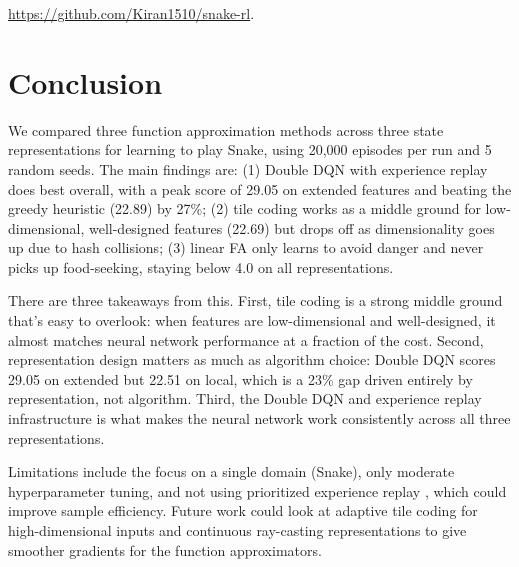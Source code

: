 \documentclass[letterpaper]{article}
\begin{document}
\url{https://github.com/Kiran1510/snake-rl}.

\section{Conclusion}

We compared three function approximation methods across three state representations for learning to play Snake, using 20,000 episodes per run and 5 random seeds. The main findings are: (1) Double DQN with experience replay does best overall, with a peak score of 29.05 on extended features and beating the greedy heuristic (22.89) by 27\%; (2) tile coding works as a middle ground for low-dimensional, well-designed features (22.69) but drops off as dimensionality goes up due to hash collisions; (3) linear FA only learns to avoid danger and never picks up food-seeking, staying below 4.0 on all representations.

There are three takeaways from this. First, tile coding is a strong middle ground that's easy to overlook: when features are low-dimensional and well-designed, it almost matches neural network performance at a fraction of the cost. Second, representation design matters as much as algorithm choice: Double DQN scores 29.05 on extended but 22.51 on local, which is a 23\% gap driven entirely by representation, not algorithm. Third, the Double DQN and experience replay infrastructure is what makes the neural network work consistently across all three representations.

Limitations include the focus on a single domain (Snake), only moderate hyperparameter tuning, and not using prioritized experience replay \cite{schaul2016prioritized}, which could improve sample efficiency. Future work could look at adaptive tile coding \cite{sherstov2005tilecoding} for high-dimensional inputs and continuous ray-casting representations to give smoother gradients for the function approximators.



\end{document}
